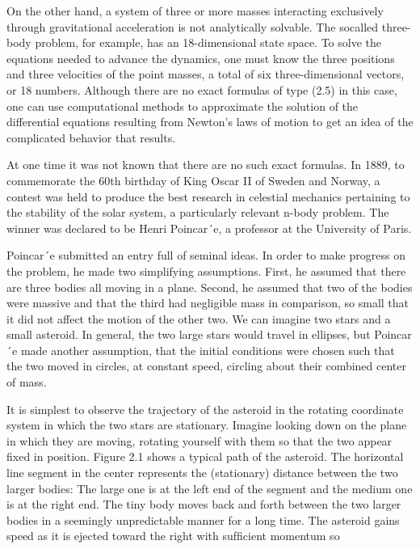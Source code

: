 \documentclass[12pt]{article}
\begin{document}
On the other hand, a system of three or more masses interacting exclusively through gravitational acceleration is not analytically 
solvable. The socalled three-body problem, for example, has an 18-dimensional state space. To solve the equations needed to advance 
the dynamics, one must know the three positions and three velocities of the point masses, a total of six three-dimensional vectors, 
or 18 numbers. Although there are no exact formulas of type (2.5) in this case, one can use computational methods to approximate the 
solution of the differential equations resulting from Newton’s laws of motion to get an idea of the complicated behavior that 
results.

At one time it was not known that there are no such exact formulas. In 1889, to commemorate the 60th birthday of King Oscar II of 
Sweden and Norway, a contest was held to produce the best research in celestial mechanics pertaining to the stability of the solar 
system, a particularly relevant n-body problem. The winner was declared to be Henri Poincar´e, a professor at the University of 
Paris.

Poincar´e submitted an entry full of seminal ideas. In order to make progress on the problem, he made two simplifying assumptions. 
First, he assumed that there are three bodies all moving in a plane. Second, he assumed that two of
the bodies were massive and that the third had negligible mass in comparison, so small that it did not affect the motion of the other 
two. We can imagine two stars and a small asteroid. In general, the two large stars would travel in ellipses, but Poincar´e made 
another assumption, that the initial conditions were chosen such that the two moved in circles, at constant speed, circling about 
their combined center of mass.

It is simplest to observe the trajectory of the asteroid in the rotating coordinate system in which the two stars are stationary. 
Imagine looking down on the plane in which they are moving, rotating yourself with them so that the two appear ﬁxed in position. 
Figure 2.1 shows a typical path of the asteroid. The horizontal line segment in the center represents the (stationary) distance 
between the two larger bodies: The large one is at the left end of the segment and the medium one is at the right end. The tiny body 
moves back and forth between the two larger bodies in a seemingly unpredictable manner for a long time. The asteroid gains speed as 
it is ejected toward the right with sufﬁcient momentum so
\end{document}
